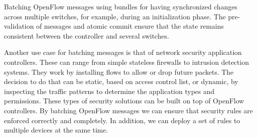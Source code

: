 Batching OpenFlow messages using bundles for having synchronized changes across multiple switches,
for example, during an initialization phase. The pre-validation of messages and atomic commit ensure
that the state remains consistent between the controller and several switches.

Another use case for batching messages is that of network security application controllers. These can range
from simple stateless firewalls to intrusion detection systems\cite{sdn}. They work by installing flows to
allow or drop future packets. The decision to do that can be static, based on access control list, or dynamic,
by inspecting the traffic patterns to determine the application types and permissions.
These types of security solutions can be built on top of OpenFlow controllers. By batching OpenFlow
messages we can ensure that security rules are enforced correctly and completely. In addition, we can
deploy a set of rules to multiple devices at the same time.